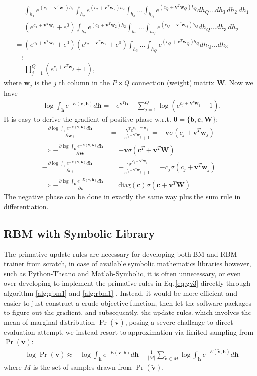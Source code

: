 \documentclass[11pt]{article}
\newcommand{\vb}{\boldsymbol{b}}
\newcommand{\vc}{\boldsymbol{c}}
\newcommand{\vh}{\boldsymbol{h}}
\newcommand{\vv}{\boldsymbol{v}}
\newcommand{\vw}{\boldsymbol{w}}
\newcommand{\mw}{\boldsymbol{W}}
\newcommand{\vvt}{\tilde{\vv}}
\newcommand{\pEC}{\boldsymbol{\theta}}
\newcommand{\PDV}[2]{\frac{\partial #1}{\partial #2}}
\newcommand{\diag}[1]{\text{diag} (#1)}
\begin{document}
{\begin{align*}
  & = \int_{h_1}e^{(c_1 + \vv^T\vw_1)h_1}                 \int_{h_2}e^{(c_2 + \vv^T\vw_2)h_2} \int_{h_3} \dots \int_{h_Q}e^{(c_Q + \vv^T\vw_Q)h_Q} dh_Q \dots dh_3\,dh_2\,dh_1 \\
  & = (e^{c_1+\vv^T\vw_1}+e^0)                            \int_{h_2}e^{(c_2 + \vv^T\vw_2)h_2} \int_{h_3} \dots \int_{h_Q}e^{(c_Q + \vv^T\vw_Q)h_Q} dh_Q \dots dh_3\,dh_2 \\
  & = (e^{c_1+\vv^T\vw_1}+e^0)                            (e^{c_2+\vv^T\vw_2} + e^0)          \int_{h_3} \dots \int_{h_Q}e^{(c_Q + \vv^T\vw_Q)h_Q} dh_Q \dots dh_3 \\
  & \quad \vdots \\
  & = \prod_{j=1}^Q{(e^{c_j + \vv^T\vw_j}+1)},
\end{align*}
where $\vw_j$ is the $j$ th column in the $P \times Q$ connection (weight) matrix $\mw$. Now we have
\begin{align*}
  -\log{\int_{\vh}{e^{-E(\vv, \vh)}} d\vh} = -e^{\vv^T\vb} - \sum_{j=1}^Q{\log{(e^{c_j + \vv^T\vw_j}+1)}}.
\end{align*}
It is easy to derive the gradient of positive phase w.r.t. $\pEC=\{\vb, \vc, \mw\}$:
\begin{align*}
  -\PDV{\log{\int_{\vh} e^{-E(\vv, \vh)}} d\vh}{\vw_j}
  & = -\frac{\vv^T e^{c_j + \vv^T\vw_j}}{e^{c_j + \vv^T\vw_j}+1} = -\vv\sigma(c_j + \vv^T\vw_j) \\
  \Rightarrow -\PDV{\log{\int_{\vh} e^{-E(\vv, \vh)}} d\vh}{\mw}
  & = -\vv\sigma(\vc^T + \vv^T\mw) \\
  -\PDV{\log{\int_{\vh} e^{-E(\vv, \vh)}} d\vh}{c_j}
  & = -\frac{c_j e^{c_j + \vv^T\vw_j}}{e^{c_j + \vv^T\vw_j}+1} = -c_j\sigma(c_j + \vv^T\vw_j) \\
  \Rightarrow -\PDV{\log{\int_{\vh} e^{-E(\vv, \vh)}} d\vh}{\vc}
  & = \diag{\vc} \sigma(\vc + \vv^T\mw)
\end{align*}
The negative phase can be done in exactly the same way plus the sum rule in differentiation. 
\subsection{RBM with Symbolic Library}
The primative update rules are necessary for developing both BM and RBM trainer from scratch, in case of available symbolic mathematics libraries however, such as Python-Theano and Matlab-Symbolic, it is often unnecessary, or even over-developing to implement the primative rules in Eq.\,\eqref{eq:gv3} directly through algorithm \eqref{alg:gbm1} and \eqref{alg:rbm1} . Instead, it would be more efficient and easier to just construct a crude objective function, then let the software packages to figure out the gradient, and subsequently, the update rules. 
which involves the mean of marginal distribution $\Pr(\vvt)$, posing a severe challenge to direct evaluation attempt, we instead resort to approximation via limited sampling from $\Pr(\vvt)$:
\begin{align}\label{eq:l(v)2}
  -\log{\Pr(\vv)} \approx -\log{\int_{\vh} e^{-E(\vv, \vh)} d\vh} + \frac{1}{|M|}\sum_{\vvt \in M}{\log{\int_{\vh} e^{-E(\vvt, \vh)}d\vh}}
\end{align}
where $M$ is the set of samples drawn from $\Pr(\vvt)$. \\
}
\end{document}
